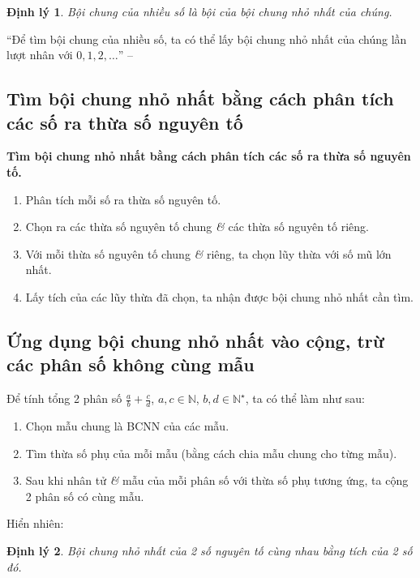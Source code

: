 \documentclass{article}
\numberwithin{equation}{section}
\newtheorem{dinhly}{Định lý}[section]
\begin{document}
\begin{dinhly}
	Bội chung của nhiều số là bội của bội chung nhỏ nhất của chúng.
\end{dinhly}
``Để tìm bội chung của nhiều số, ta có thể lấy bội chung nhỏ nhất của chúng lần lượt nhân với $0,1,2,\ldots$'' -- \cite[p. 55]{SGK_Toan_6_Canh_Dieu_tap_1}

\subsection{Tìm bội chung nhỏ nhất bằng cách phân tích các số ra thừa số nguyên tố}

\begin{tcolorbox}
	\textbf{Tìm bội chung nhỏ nhất bằng cách phân tích các số ra thừa số nguyên tố.}
	\begin{enumerate}
		\item Phân tích mỗi số ra thừa số nguyên tố.
		\item Chọn ra các thừa số nguyên tố chung \textit{\&} các thừa số nguyên tố riêng.
		\item Với mỗi thừa số nguyên tố chung \textit{\&} riêng, ta chọn lũy thừa với số mũ lớn nhất.
		\item Lấy tích của các lũy thừa đã chọn, ta nhận được bội chung nhỏ nhất cần tìm.
	\end{enumerate}
\end{tcolorbox}

\subsection{Ứng dụng bội chung nhỏ nhất vào cộng, trừ các phân số không cùng mẫu}

\begin{tcolorbox}
	Để tính tổng 2 phân số $\frac{a}{b} + \frac{c}{d}$, $a,c\in\mathbb{N}$, $b,d\in\mathbb{N}^\star$, ta có thể làm như sau:
	\begin{enumerate}
		\item Chọn mẫu chung là BCNN của các mẫu.
		\item Tìm thừa số phụ của mỗi mẫu (bằng cách chia mẫu chung cho từng mẫu).
		\item Sau khi nhân tử \textit{\&} mẫu của mỗi phân số với thừa số phụ tương ứng, ta cộng 2 phân số có cùng mẫu.
	\end{enumerate}
\end{tcolorbox}
Hiển nhiên:

\begin{dinhly}
	Bội chung nhỏ nhất của 2 số nguyên tố cùng nhau bằng tích của 2 số đó.
\end{dinhly}
\end{document}
